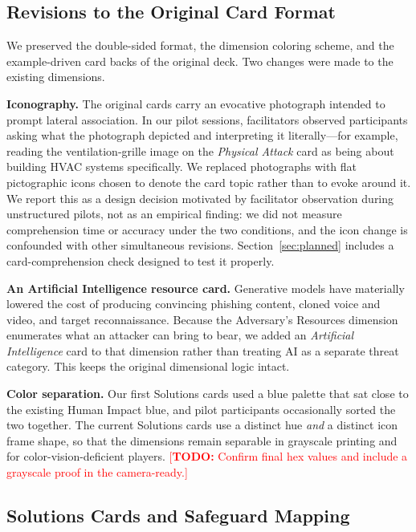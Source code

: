 \documentclass[10pt,twocolumn,letterpaper]{article}
\newcommand{\todo}[1]{\textcolor{red}{[\textbf{TODO:} #1]}}
\begin{document}
\subsection{Revisions to the Original Card Format}

We preserved the double-sided format, the dimension coloring scheme, and the
example-driven card backs of the original deck. Two changes were made to the
existing dimensions.

\textbf{Iconography.} The original cards carry an evocative photograph intended
to prompt lateral association. In our pilot sessions, facilitators observed
participants asking what the photograph depicted and interpreting it
literally---for example, reading the ventilation-grille image on the
\emph{Physical Attack} card as being about building HVAC systems specifically.
We replaced photographs with flat pictographic icons chosen to denote the card
topic rather than to evoke around it. We report this as a design decision
motivated by facilitator observation during unstructured pilots, not as an
empirical finding: we did not measure comprehension time or accuracy under the
two conditions, and the icon change is confounded with other simultaneous
revisions. Section~\ref{sec:planned} includes a card-comprehension check
designed to test it properly.

\textbf{An Artificial Intelligence resource card.} Generative models have
materially lowered the cost of producing convincing phishing content, cloned
voice and video, and target reconnaissance. Because the Adversary's Resources
dimension enumerates what an attacker can bring to bear, we added an
\emph{Artificial Intelligence} card to that dimension rather than treating AI
as a separate threat category. This keeps the original dimensional logic
intact.

\textbf{Color separation.} Our first Solutions cards used a blue palette that
sat close to the existing Human Impact blue, and pilot participants
occasionally sorted the two together. The current Solutions cards use a
distinct hue \emph{and} a distinct icon frame shape, so that the dimensions
remain separable in grayscale printing and for color-vision-deficient players.
\todo{Confirm final hex values and include a grayscale proof in the camera-ready.}

\subsection{Solutions Cards and Safeguard Mapping}
\end{document}
